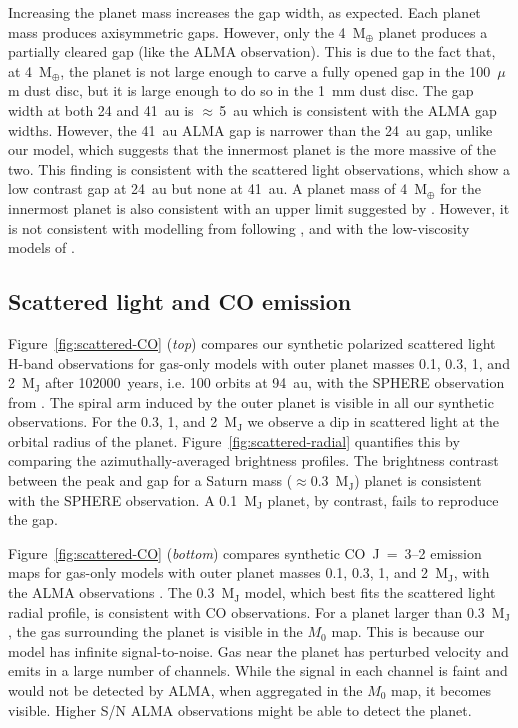 \documentclass[usenatbib,a4paper,times]{mnras}
\renewcommand{\earth}{\mathrm{M}_{\oplus}}
\begin{document}
Increasing the planet mass increases the gap width, as expected. Each planet
mass produces axisymmetric gaps. However, only the 4~$\earth{}$ planet produces
a partially cleared gap (like the ALMA observation). This is due to the fact
that, at 4~$\earth{}$, the planet is not large enough to carve a fully opened
gap in the 100~$\mu$m dust disc, but it is large enough to do so in the 1~mm
dust disc. The gap width at both 24 and 41~au is $\approx\,$5~au which is
consistent with the ALMA gap widths. However, the 41~au ALMA gap is narrower
than the 24~au gap, unlike our model, which suggests that the innermost planet
is the more massive of the two. This finding is consistent with the scattered
light observations, which show a low contrast gap at 24~au but none at 41~au. A
planet mass of 4~$\earth{}$ for the innermost planet is also consistent with an
upper limit suggested by \citet{nomura:2016}. However, it is not consistent with
modelling from \citet{van-boekel:2017} following \citet{duffell:2015}, and with
the low-viscosity models of \citet{dong:2017b}.





\subsection{Scattered light and CO emission}

Figure~\ref{fig:scattered-CO} (\textit{top}) compares our synthetic polarized
scattered light H-band observations for gas-only models with outer planet masses
0.1, 0.3, 1, and 2~$\mathrm{M_J}$ after 102000~years, i.e. 100 orbits at 94~au,
with the SPHERE observation from \citet{van-boekel:2017}. The spiral arm induced
by the outer planet is visible in all our synthetic observations. For the 0.3,
1, and 2~$\mathrm{M_J}$ we observe a dip in scattered light at the orbital
radius of the planet. Figure~\ref{fig:scattered-radial} quantifies this by
comparing the azimuthally-averaged brightness profiles. The brightness contrast
between the peak and gap for a Saturn mass ($\approx$0.3~$\mathrm{M_J}$) planet
is consistent with the SPHERE observation.  A 0.1~$\mathrm{M_J}$ planet, by
contrast, fails to reproduce the gap.

Figure~\ref{fig:scattered-CO} (\textit{bottom}) compares synthetic CO~J~=~3--2
emission maps for gas-only models with outer planet masses 0.1, 0.3, 1, and
2~$\mathrm{M_J}$, with the ALMA observations \citep{huang:2018}. The
0.3~$\mathrm{M_J}$ model, which best fits the scattered light radial profile, is
consistent with CO observations. For a planet larger than 0.3~$\mathrm{M_J}$,
the gas surrounding the planet is visible in the $M_0$ map. This is because our
model has infinite signal-to-noise. Gas near the planet has perturbed velocity
and emits in a large number of channels. While the signal in each channel is
faint and would not be detected by ALMA, when aggregated in the $M_0$ map, it
becomes visible. Higher S/N ALMA observations might be able to detect the
planet.
\end{document}
